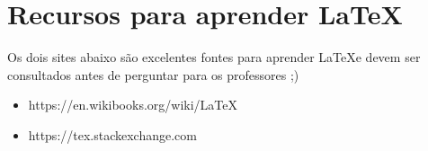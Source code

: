 \documentclass[10pt,conference]{IEEEtran}
\begin{document}
\section*{Recursos para aprender \LaTeX}

Os dois sites abaixo são excelentes fontes para aprender \LaTeX e devem ser consultados antes de perguntar para os professores ;)

\begin{itemize}
\item https://en.wikibooks.org/wiki/LaTeX
\item https://tex.stackexchange.com
\end{itemize}



\end{document}
